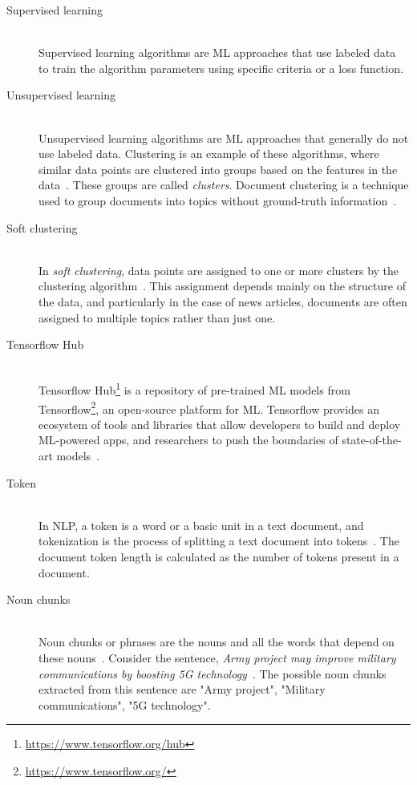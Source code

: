 \begin{description}
	\item[Supervised learning] \hfill \\ Supervised learning algorithms are \ac{ML} approaches that use labeled data~\cite{9155761} to train the algorithm parameters using specific criteria or a loss function.
	
	\item[Unsupervised learning] \hfill \\ Unsupervised learning algorithms are \ac{ML} approaches that generally do not use labeled data. Clustering is an example of these algorithms, where similar data points are clustered into groups based on the features in the data~\cite{mahesh2020machine}. These groups are called \textit{clusters}. Document clustering is a technique used to group documents into topics without ground-truth information~\cite{de2012document}.
	
	\item[Soft clustering] \hfill \\ In \textit{soft clustering}, data points are assigned to one or more clusters by the clustering algorithm~\cite{de2012document}. This assignment depends mainly on the structure of the data, and particularly in the case of news articles, documents are often assigned to multiple topics rather than just one.
	
	 \item[Tensorflow Hub] \hfill \\ Tensorflow Hub\footnote{\url{https://www.tensorflow.org/hub}} is a repository of pre-trained ML models from Tensorflow\footnote{\url{https://www.tensorflow.org/}}, an open-source platform for ML. Tensorflow provides an ecosystem of tools and libraries that allow developers to build and deploy ML-powered apps, and researchers to push the boundaries of state-of-the-art models~\cite{tensorflow_developers_2022_6574269}.
	
	 \item[Token] \hfill \\ In \ac{NLP}, a token is a word or a basic unit in a text document, and tokenization is the process of splitting a text document into tokens~\cite{webster1992tokenization}. The document token length is calculated as the number of tokens present in a document.
	
	\item[Noun chunks] \hfill \\ Noun chunks or phrases are the nouns and all the words that depend on these nouns~\cite{noun_chunk}. Consider the sentence, \textit{Army project may improve military communications by boosting 5G technology}~\cite{sample_news_article}. The possible noun chunks extracted from this sentence are "Army project", "Military communications", "5G technology".
	

\end{description}
